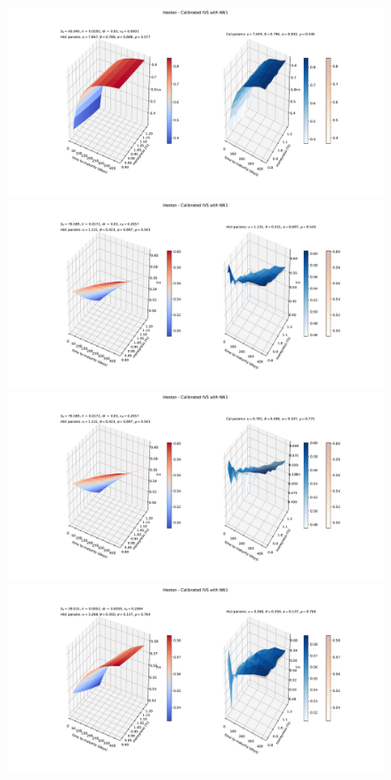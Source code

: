 \documentclass[
a4paper,     %
12pt           %
]{scrartcl}  %
\numberwithin{equation}{section}
\begin{document}
\begin{figure}
\begin{minipage}{0.49\textwidth}
		\includegraphics[width=\textwidth]{fig/impvolsurf_calibrated_1}
	\end{minipage}
	\begin{minipage}{0.49\textwidth}
		\includegraphics[width=\textwidth]{fig/impvolsurf_2}
	\end{minipage}
	\begin{minipage}{0.49\textwidth}
		\includegraphics[width=\textwidth]{fig/impvolsurf_calibrated_2}
	\end{minipage}
	\begin{minipage}{0.49\textwidth}
		\includegraphics[width=\textwidth]{fig/impvolsurf_3}

\end{minipage}
\end{figure}
\end{document}
